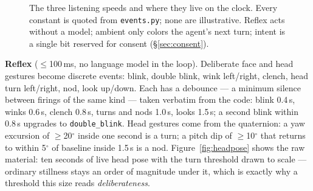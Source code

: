 \documentclass{article}
\begin{document}
\begin{figure}[h]
\centering
{}
\caption{The three listening speeds and where they live on the clock. Every constant is quoted from \texttt{events.py}; none are illustrative. Reflex acts without a model; ambient only colors the agent's next turn; intent is a single bit reserved for consent (\S\ref{sec:consent}).}
\label{fig:speeds}
\end{figure}

\textbf{Reflex} ($\le$100\,ms, no language model in the loop). Deliberate face and head gestures become discrete events: blink, double blink, wink left/right, clench, head turn left/right, nod, look up/down. Each has a debounce --- a minimum silence between firings of the same kind --- taken verbatim from the code: blink 0.4\,s, winks 0.6\,s, clench 0.8\,s, turns and nods 1.0\,s, looks 1.5\,s; a second blink within 0.8\,s upgrades to \texttt{double\_blink}. Head gestures come from the quaternion: a yaw excursion of $\ge$20$^\circ$ inside one second is a turn; a pitch dip of $\ge$10$^\circ$ that returns to within 5$^\circ$ of baseline inside 1.5\,s is a nod. Figure~\ref{fig:headpose} shows the raw material: ten seconds of live head pose with the turn threshold drawn to scale --- ordinary stillness stays an order of magnitude under it, which is exactly why a threshold this size reads \emph{deliberateness}.
\end{document}
